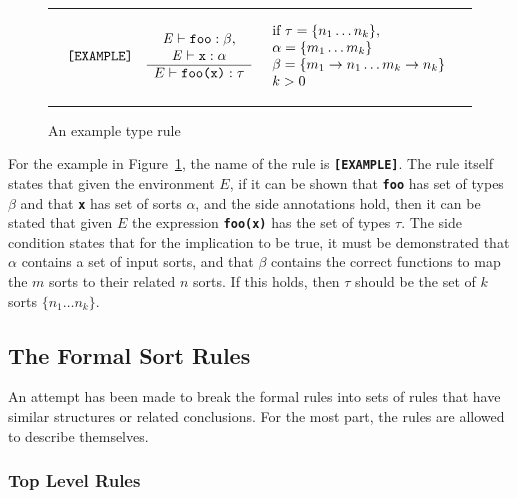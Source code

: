 \documentclass[12pt]{article} %
\newcommand{\reserved}[1]{\textbf{\texttt{#1}}} %
\newcommand{\RULELAB}[1]{\texttt{#1}}
\newcommand{\UNSPACEFORBOX}{\vspace{-2ex}}
\newcommand{\HLINE}{\UNSPACEFORBOX%
\begin{flushleft}\rule{\textwidth}{0.01in}\end{flushleft}%
\UNSPACEFORBOX}
\newenvironment{BFIGURE}{

\begin{figure}
\small
\HLINE
}{
\HLINE
\normalsize
\end{figure}
}
\begin{document}
\begin{BFIGURE}
\begin{displaymath}
\begin{array}{lll}
\RULELAB{[EXAMPLE]} &
\begin{array}{c}
\mbox{\textit{E}} \vdash \mbox{\texttt{foo}}:\beta,\\
\mbox{\textit{E}} \vdash \mbox{\texttt{x}}:\alpha \\
\hline
E \vdash \mbox{\texttt{foo(x)}}:\tau
\end{array}
&
\begin{array}{l}
\mbox{if } \tau = \{n_1 \dots n_k\}, \\
\alpha = \{m_1 \dots m_k\} \\
\beta = \{m_1 \rightarrow n_1 \dots m_k \rightarrow n_k\} \\
k > 0
\\
\end{array}
\end{array}
\end{displaymath}
\caption{An example type rule}
\label{typeruleex}
\end{BFIGURE}

For the example in Figure~\ref{typeruleex}, the name of the rule is
\reserved{[EXAMPLE]}. The rule itself states that given the
environment $E$, if it can be shown that \reserved{foo} has set of types
$\beta$ and that \reserved{x} has set of sorts $\alpha$, and the side
annotations hold, then it can be
stated that given $E$ the expression \reserved{foo(x)} has the set of 
types $\tau$. The side condition states that for the implication to be
true, it must be demonstrated that $\alpha$ contains a set of input sorts,
and that $\beta$ contains the correct functions to map the $m$ sorts to
their related $n$ sorts. If this holds, then $\tau$ should be the set
of $k$ sorts $\{n_1 \dots n_k\}$.

\subsection{The Formal Sort Rules}
An attempt has been made to break the formal rules into sets of rules
that have similar structures or related conclusions. For the most
part, the rules are allowed to describe themselves.



\subsubsection{Top Level Rules}
\label{toprules}
\end{document}
